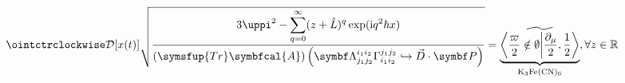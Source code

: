 \documentclass{standalone}
\begin{document}
\Huge
$\displaystyle \ointctrclockwise\mathcal{D}[x(t)]\sqrt{\frac{\displaystyle3\uppi^2-\sum_{q=0}^{\infty}(z+\hat L)^{q}\exp(\mathrm{i}q^2 \hbar x)}{\displaystyle (\symsfup{Tr}\symbfcal{A})\left(\symbf\Lambda_{j_1j_2}^{i_1i_2}\Gamma_{i_1i_2}^{j_1j_2}\hookrightarrow\vec D\cdot \symbf P  \right)}}
=\underbrace{\widetilde{\left\langle \frac{\varpi}{2}\notin \emptyset\middle\vert \frac{\partial_\mu}{2},\frac{1}{2}\right\rangle}}_{\mathrm{K}_3\mathrm{Fe}(\mathrm{CN})_6} ,\forall z \in \mathbb{R}$
\end{document}
